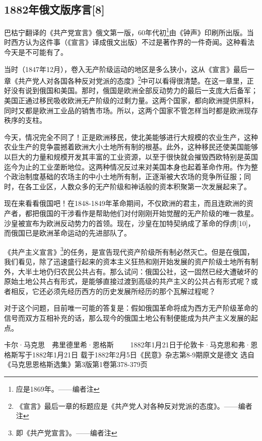 \documentclass[UTF8,zihao=-4,a4paper]{ctexart}
\begin{document}
\subsection*{1882年俄文版序言[8]}
巴枯宁翻译的《共产党宣言》俄文第一版，60年代初\footnote{应是1869年。——编者注}由《钟声》印刷所出版。当时西方认为这件事（《宣言》译成俄文出版）不过是著作界的一件奇闻。这种看法今天是不可能有了。\par
当时（1847年12月），卷入无产阶级运动的地区是多么狭小，这从《宣言》最后一章《共产党人对各国各种反对党派的态度》\footnote{《宣言》最后一章的标题应是《共产党人对各种反对党派的态度》。——编者注}中可以看得很清楚。在这一章里，正好没有说到俄国和美国。那时，俄国是欧洲全部反动势力的最后一支庞大后备军；美国正通过移民吸收欧洲无产阶级的过剩力量。这两个国家，都向欧洲提供原料，同时又都是欧洲工业品的销售市场。所以，这两个国家不管怎样当时都是欧洲现存秩序的支柱。\par
今天，情况完全不同了！正是欧洲移民，使北美能够进行大规模的农业生产，这种农业生产的竞争震撼着欧洲大小土地所有制的根基。此外，这种移民还使美国能够以巨大的力量和规模开发其丰富的工业资源，以至于很快就会摧毁西欧特别是英国迄今为止的工业垄断地位。这两种情况反过来对美国本身也起着革命作用。作为整个政治制度基础的农场主的中小土地所有制，正逐渐被大农场的竞争所征服；同时，在各工业区，人数众多的无产阶级和神话般的资本积聚第一次发展起来了。\par
现在来看看俄国吧！在1848-1849年革命期间，不仅欧洲的君主，而且连欧洲的资产者，都把俄国的干涉看作是帮助他们对付刚刚开始觉醒的无产阶级的唯一救星。沙皇被宣布为欧洲反动势力的首领。现在，沙皇在加特契纳成了革命的俘虏[10]，而俄国已是欧洲革命运动的先进部队了。\par
《共产主义宣言》\footnote{即《共产党宣言》。——编者注}的任务，是宣告现代资产阶级所有制必然灭亡。但是在俄国，我们看见，除了迅速盛行起来的资本主义狂热和刚开始发展的资产阶级土地所有制外，大半土地仍归农民公共占有。那么试问：俄国公社，这一固然已经大遭破坏的原始土地公共占有形式，是能够直接过渡到高级的共产主义的公共占有形式呢？或者相反，它还必须先经历西方的历史发展所经历的那个瓦解过程呢？\par
对于这个问题，目前唯一可能的答复是：假如俄国革命将成为西方无产阶级革命的信号而双方互相补充的话，那么现今的俄国土地公有制便能成为共产主义发展的起点。\par
卡尔·马克思　弗里德里希·恩格斯 
 　　1882年1月21日于伦敦卡·马克思和弗·恩格斯写于1882年1月21日 
 载于1882年2月5日《民意》杂志第8-9期原文是德文 
 选自《马克思恩格斯选集》第3版第1卷第378-379页\par
\end{document}
